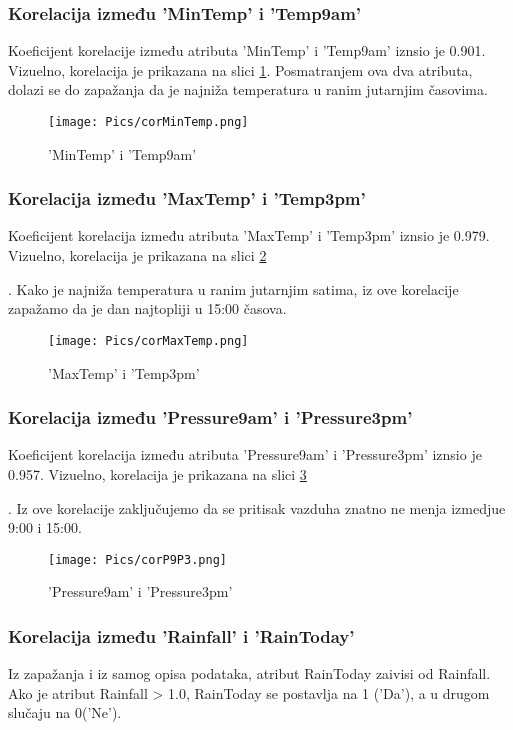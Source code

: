 \documentclass[a4paper]{article}
\begin{document}
\subsubsection{Korelacija između 'MinTemp' i 'Temp9am'}
\label{subsubsec:korMinTemp}
Koeficijent korelacije između atributa 'MinTemp' i 'Temp9am' iznsio je 0.901. Vizuelno, korelacija je prikazana na slici \ref{fig:cor-1}. Posmatranjem ova dva atributa, dolazi se do zapažanja da je najniža temperatura u ranim jutarnjim časovima.
\begin{figure}[H]
     \centering
     \texttt{[image: Pics/corMinTemp.png]}
     \caption{'MinTemp' i 'Temp9am'}
     \label{fig:cor-1}
\end{figure}

\subsubsection{Korelacija između 'MaxTemp' i 'Temp3pm'}
\label{subsubsec:korMaxTemp}
Koeficijent korelacija između atributa 'MaxTemp' i 'Temp3pm' iznsio je 0.979. Vizuelno, korelacija je prikazana na slici \ref{fig:cor-2}\par. Kako je najniža temperatura u ranim jutarnjim satima, iz ove korelacije zapažamo da je dan najtopliji u 15:00 časova.
\begin{figure}[H]
     \centering
     \texttt{[image: Pics/corMaxTemp.png]}
     \caption{'MaxTemp' i 'Temp3pm'}
     \label{fig:cor-2}
\end{figure}


\subsubsection{Korelacija između 'Pressure9am' i 'Pressure3pm'}
\label{subsubsec:kotP9P3}
Koeficijent korelacija između atributa 'Pressure9am' i 'Pressure3pm' iznsio je 0.957. Vizuelno, korelacija je prikazana na slici \ref{fig:cor-3}\par. Iz ove korelacije zaključujemo da se pritisak vazduha znatno ne menja izmedjue 9:00 i 15:00.
\begin{figure}[H]
     \centering
     \texttt{[image: Pics/corP9P3.png]}
     \caption{'Pressure9am' i 'Pressure3pm'}
     \label{fig:cor-3}
\end{figure}


\subsubsection{Korelacija između 'Rainfall' i 'RainToday'}
\label{subsubsec:korRaRT}
Iz zapažanja i iz samog opisa podataka, atribut RainToday zaivisi od Rainfall. Ako je atribut Rainfall > 1.0, RainToday se postavlja na 1 ('Da'), a u drugom slučaju na 0('Ne').\par
\end{document}
